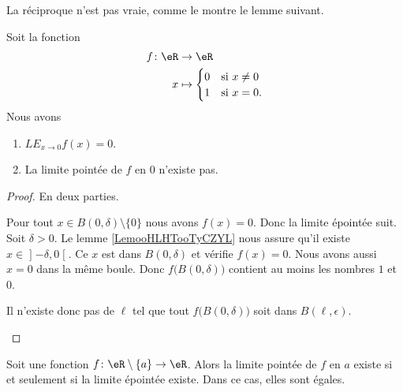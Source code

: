 La réciproque n'est pas vraie, comme le montre le lemme suivant.
\begin{lemma}     \label{LEMooOSNGooJpiXbK}
	Soit la fonction
	\begin{equation}
		\begin{aligned}
			f\colon \eR & \to \eR                           \\
			x           & \mapsto \begin{cases}
				0 & \text{si } x\neq 0  \\
				1 & \text{si }x=0.
			\end{cases}
		\end{aligned}
	\end{equation}
	Nous avons
	\begin{enumerate}
		\item       \label{ITEMooNRNCooFhbZwB}
		      \( {LE}_{x\to 0}f(x)=0\).
		\item       \label{ITEMooUSWMooMNPMCT}
		      La limite pointée de \( f\) en \( 0\) n'existe pas.
	\end{enumerate}
\end{lemma}

\begin{proof}
	En deux parties.
	\begin{subproof}
		Pour tout \( x\in B(0,\delta)\setminus\{ 0 \}\) nous avons \( f(x)=0\). Donc la limite épointée suit.
		Soit \( \delta>0\). Le lemme \ref{LemooHLHTooTyCZYL} nous assure qu'il existe \( x\in \mathopen] -\delta , 0 \mathclose[\). Ce \( x\) est dans \( B(0,\delta)\) et vérifie \( f(x)=0\). Nous avons aussi \( x=0\) dans la même boule. Donc \( f\big( B(0,\delta) \big)\) contient au moins les nombres \( 1\) et \( 0\).

		Il n'existe donc pas de \( \ell\) tel que tout \( f\big( B(0,\delta) \big)\) soit dans \( B(\ell, \epsilon)\).
	\end{subproof}
\end{proof}

\begin{lemma}\label{LEMooTPNEooRurTJJ}
	Soit une fonction \( f\colon \eR\setminus\{ a \}\to \eR\). Alors la limite pointée de \( f\) en \( a\) existe si et seulement si la limite épointée existe. Dans ce cas, elles sont égales.
\end{lemma}

